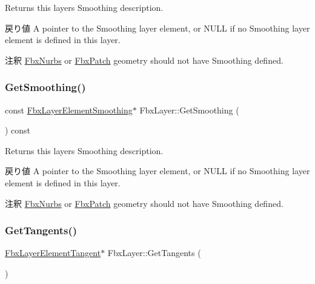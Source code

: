 Returns this layer\textquotesingle{}s Smoothing description. \begin{DoxyReturn}{戻り値}
A pointer to the Smoothing layer element, or {\ttfamily N\+U\+LL} if no Smoothing layer element is defined in this layer. 
\end{DoxyReturn}
\begin{DoxyRemark}{注釈}
\hyperlink{class_fbx_nurbs}{Fbx\+Nurbs} or \hyperlink{class_fbx_patch}{Fbx\+Patch} geometry should not have Smoothing defined. 
\end{DoxyRemark}
\mbox{\label{class_fbx_layer_a82ea6910c739e0e56b31dd71a053dc44}} 
\subsubsection{\texorpdfstring{Get\+Smoothing()}{GetSmoothing()}\hspace{0.1cm}{\footnotesize\ttfamily [2/2]}}
{\footnotesize\ttfamily const \hyperlink{class_fbx_layer_element_smoothing}{Fbx\+Layer\+Element\+Smoothing}$\ast$ Fbx\+Layer\+::\+Get\+Smoothing (\begin{DoxyParamCaption}{ }\end{DoxyParamCaption}) const}

Returns this layer\textquotesingle{}s Smoothing description. \begin{DoxyReturn}{戻り値}
A pointer to the Smoothing layer element, or {\ttfamily N\+U\+LL} if no Smoothing layer element is defined in this layer. 
\end{DoxyReturn}
\begin{DoxyRemark}{注釈}
\hyperlink{class_fbx_nurbs}{Fbx\+Nurbs} or \hyperlink{class_fbx_patch}{Fbx\+Patch} geometry should not have Smoothing defined. 
\end{DoxyRemark}
\mbox{\label{class_fbx_layer_a6c1e9d8dead9600029e27d690ee0e662}} 
\subsubsection{\texorpdfstring{Get\+Tangents()}{GetTangents()}\hspace{0.1cm}{\footnotesize\ttfamily [1/2]}}
{\footnotesize\ttfamily \hyperlink{class_fbx_layer_element_tangent}{Fbx\+Layer\+Element\+Tangent}$\ast$ Fbx\+Layer\+::\+Get\+Tangents (\begin{DoxyParamCaption}{ }\end{DoxyParamCaption})}

